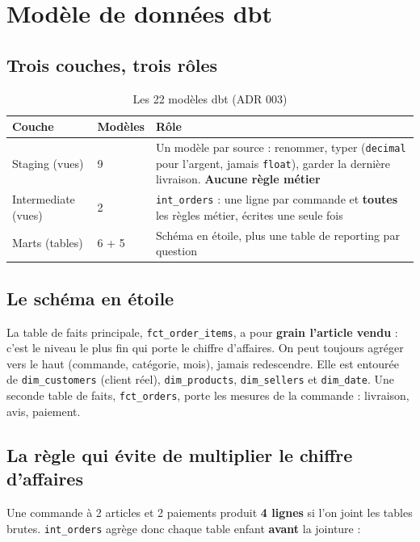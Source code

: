 \documentclass[11pt, a4paper, oneside, headings=normal, numbers=noenddot, DIV=12]{scrartcl}
\begin{document}
\section{Modèle de données dbt}

\subsection{Trois couches, trois rôles}
\begin{table}[H]
\centering\small
\begin{tabularx}{\linewidth}{@{}L{2.6cm} L{2.2cm} Y@{}}
\toprule
\textbf{Couche} & \textbf{Modèles} & \textbf{Rôle} \\
\midrule
Staging (vues) & 9 & Un modèle par source : renommer, typer (\texttt{decimal} pour l'argent, jamais \texttt{float}), garder la dernière livraison. \textbf{Aucune règle métier} \\
Intermediate (vues) & 2 & \texttt{int\_orders} : une ligne par commande et \textbf{toutes} les règles métier, écrites une seule fois \\
Marts (tables) & 6 + 5 & Schéma en étoile, plus une table de reporting par question \\
\bottomrule
\end{tabularx}
\caption{Les 22 modèles dbt (ADR 003)}
\end{table}

\subsection{Le schéma en étoile}
La table de faits principale, \texttt{fct\_order\_items}, a pour \textbf{grain l'article vendu} : c'est le niveau le plus fin qui porte
le chiffre d'affaires. On peut toujours agréger vers le haut (commande, catégorie, mois), jamais redescendre. Elle est entourée de
\texttt{dim\_customers} (client réel), \texttt{dim\_products}, \texttt{dim\_sellers} et \texttt{dim\_date}. Une seconde table de faits,
\texttt{fct\_orders}, porte les mesures de la commande : livraison, avis, paiement.

\subsection{La règle qui évite de multiplier le chiffre d'affaires}
Une commande à 2 articles et 2 paiements produit \textbf{4 lignes} si l'on joint les tables brutes. \texttt{int\_orders} agrège donc chaque
table enfant \textbf{avant} la jointure :
\end{document}
